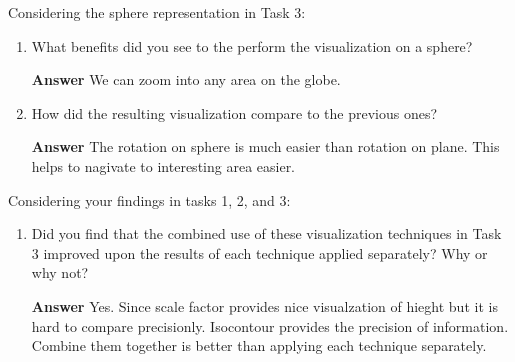 \documentclass[11pt]{article}
\begin{document}
\noindent Considering the sphere representation in Task 3:

\begin{enumerate}[label=\arabic*.]

\item What benefits did you see to the perform the visualization on a sphere?

\noindent\textbf{Answer} We can zoom into any area on the globe.

\item How did the resulting visualization compare to the previous ones?

\noindent\textbf{Answer} The rotation on sphere is much easier than rotation on plane. This helps to nagivate to interesting area easier.

\end{enumerate}

\noindent Considering your findings in tasks 1, 2, and 3:

\begin{enumerate}[label=\arabic*.]

\item Did you find that the combined use of these visualization techniques in Task 3 improved upon the results of each technique applied separately? Why or why not?

\noindent\textbf{Answer} Yes. Since scale factor provides nice visualzation of hieght but it is hard to compare precisionly. Isocontour provides the precision of information. Combine them together is better than applying each technique separately.

\end{enumerate}
\end{document}
